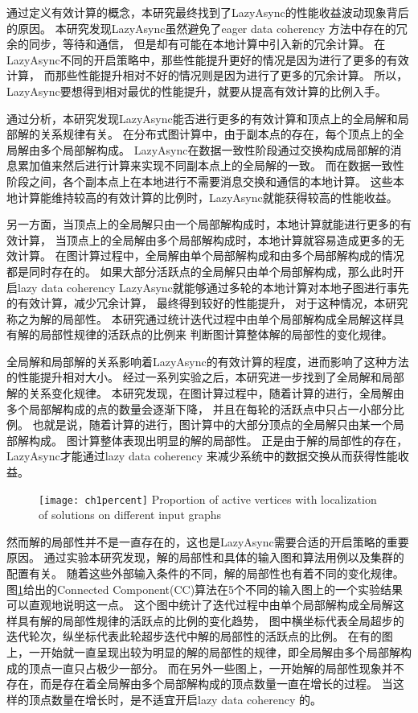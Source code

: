 通过定义有效计算的概念，本研究最终找到了LazyAsync的性能收益波动现象背后的原因。
本研究发现LazyAsync虽然避免了eager data coherency 方法中存在的冗余的同步，等待和通信，
但是却有可能在本地计算中引入新的冗余计算。
在LazyAsync不同的开启策略中，那些性能提升更好的情况是因为进行了更多的有效计算，
而那些性能提升相对不好的情况则是因为进行了更多的冗余计算。
所以，LazyAsync要想得到相对最优的性能提升，就要从提高有效计算的比例入手。


通过分析，本研究发现LazyAsync能否进行更多的有效计算和顶点上的全局解和局部解的关系规律有关。
在分布式图计算中，由于副本点的存在，每个顶点上的全局解由多个局部解构成。
LazyAsync在数据一致性阶段通过交换构成局部解的消息累加值来然后进行计算来实现不同副本点上的全局解的一致。
而在数据一致性阶段之间，各个副本点上在本地进行不需要消息交换和通信的本地计算。
这些本地计算能维持较高的有效计算的比例时，LazyAsync就能获得较高的性能收益。

另一方面，当顶点上的全局解只由一个局部解构成时，本地计算就能进行更多的有效计算，
当顶点上的全局解由多个局部解构成时，本地计算就容易造成更多的无效计算。
在图计算过程中，全局解由单个局部解构成和由多个局部解构成的情况都是同时存在的。
如果大部分活跃点的全局解只由单个局部解构成，那么此时开启lazy data coherency 
LazyAsync就能够通过多轮的本地计算对本地子图进行事先的有效计算，减少冗余计算，
最终得到较好的性能提升，
对于这种情况，本研究称之为解的局部性。
本研究通过统计迭代过程中由单个局部解构成全局解这样具有解的局部性规律的活跃点的比例来
判断图计算整体解的局部性的变化规律。



全局解和局部解的关系影响着LazyAsync的有效计算的程度，进而影响了这种方法的性能提升相对大小。
经过一系列实验之后，本研究进一步找到了全局解和局部解的关系变化规律。
本研究发现，在图计算过程中，随着计算的进行，全局解由多个局部解构成的点的数量会逐渐下降，
并且在每轮的活跃点中只占一小部分比例。
也就是说，随着计算的进行，图计算中的大部分顶点的全局解只由某一个局部解构成。
图计算整体表现出明显的解的局部性。
正是由于解的局部性的存在，LazyAsync才能通过lazy data coherency 来减少系统中的数据交换从而获得性能收益。


\begin{figure}[!htbp]
  \centering
  \texttt{[image: ch1percent]}
  { Proportion of active vertices with localization of solutions on different input graphs}
  \label{fig:ch1percent}
\end{figure}

然而解的局部性并不是一直存在的，这也是LazyAsync需要合适的开启策略的重要原因。
通过实验本研究发现，解的局部性和具体的输入图和算法用例以及集群的配置有关。
随着这些外部输入条件的不同，解的局部性也有着不同的变化规律。
图\ref{fig:ch1percent}给出的Connected Component(CC)算法在5个不同的输入图上的一个实验结果
可以直观地说明这一点。
这个图中统计了迭代过程中由单个局部解构成全局解这样具有解的局部性规律的活跃点的比例的变化趋势，
图中横坐标代表全局超步的迭代轮次，纵坐标代表此轮超步迭代中解的局部性的活跃点的比例。
在有的图上，一开始就一直呈现出较为明显的解的局部性的规律，即全局解由多个局部解构成的顶点一直只占极少一部分。
而在另外一些图上，一开始解的局部性现象并不存在，而是存在着全局解由多个局部解构成的顶点数量一直在增长的过程。
当这样的顶点数量在增长时，是不适宜开启lazy data coherency 的。

